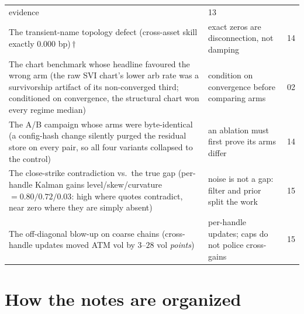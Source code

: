 \documentclass[11pt]{article}
\begin{document}
\begin{longtable}{p{}p{}r}
evidence & 13\\
The transient-name topology defect (cross-asset skill exactly $0.000$ bp)\,$\dagger$ &
exact zeros are disconnection, not damping & 14\\
The chart benchmark whose headline favoured the wrong arm (the raw SVI
chart's lower arb rate was a survivorship artifact of its non-converged
third; conditioned on convergence, the structural chart won every regime
median) & condition on convergence before comparing arms & 02\\
The A/B campaign whose arms were byte-identical (a config-hash change
silently purged the residual store on every pair, so all four variants
collapsed to the control) & an ablation must first prove its arms differ & 14\\
The close-strike contradiction vs.\ the true gap (per-handle Kalman gains
level/skew/curvature $=0.80/0.72/0.03$: high where quotes contradict, near
zero where they are simply absent) & noise is not a gap: filter and prior
split the work & 15\\
The off-diagonal blow-up on coarse chains (cross-handle updates moved ATM
vol by $3$--$28$ vol \emph{points}) &
per-handle updates; caps do not police cross-gains & 15\\
\bottomrule
\end{longtable}

\section{How the notes are organized}
\label{sec:org}
\end{document}
